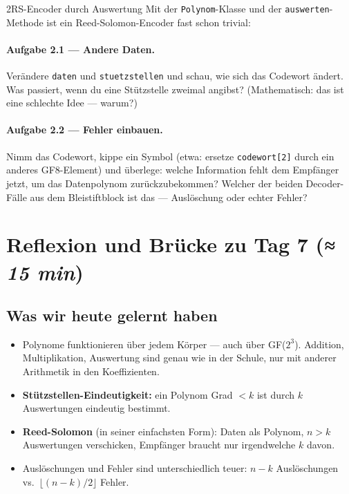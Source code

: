 \begin{pythoneinheit}{2}{RS-Encoder durch Auswertung}
Mit der \texttt{Polynom}-Klasse und der \texttt{auswerten}-Methode
ist ein Reed-Solomon-Encoder fast schon trivial:


\paragraph{Aufgabe 2.1 — Andere Daten.}
Verändere \texttt{daten} und \texttt{stuetzstellen} und schau, wie
sich das Codewort ändert. Was passiert, wenn du eine Stützstelle
zweimal angibst? (Mathematisch: das ist eine schlechte Idee — warum?)

\paragraph{Aufgabe 2.2 — Fehler einbauen.}
Nimm das Codewort, kippe ein Symbol (etwa: ersetze \texttt{codewort[2]}
durch ein anderes GF8-Element) und überlege: welche Information
fehlt dem Empfänger jetzt, um das Datenpolynom zurückzubekommen?
Welcher der beiden Decoder-Fälle aus dem Bleistiftblock ist das —
Auslöschung oder echter Fehler?
\end{pythoneinheit}

\section{Reflexion und Brücke zu Tag 7 \normalfont(\textit{≈ 15 min})}

\subsection*{Was wir heute gelernt haben}

\begin{itemize}
\item Polynome funktionieren über jedem Körper — auch über GF($2^3$).
  Addition, Multiplikation, Auswertung sind genau wie in der Schule,
  nur mit anderer Arithmetik in den Koeffizienten.
\item \textbf{Stützstellen-Eindeutigkeit:} ein Polynom Grad $< k$ ist
  durch $k$ Auswertungen eindeutig bestimmt.
\item \textbf{Reed-Solomon} (in seiner einfachsten Form): Daten als
  Polynom, $n > k$ Auswertungen verschicken, Empfänger braucht nur
  irgendwelche $k$ davon.
\item Auslöschungen und Fehler sind unterschiedlich teuer:
  $n - k$ Auslöschungen vs.\ $\lfloor (n - k) / 2 \rfloor$ Fehler.
\end{itemize}

